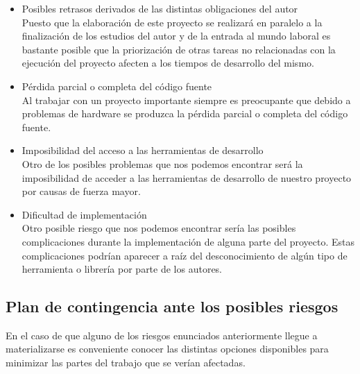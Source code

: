 \begin{itemize}
    \item Posibles retrasos derivados de las distintas obligaciones del autor\\
        Puesto que la elaboración de este proyecto se realizará en paralelo a la finalización de los estudios del autor y de la entrada al mundo laboral es bastante posible que la priorización de otras tareas no relacionadas con la ejecución del proyecto afecten a los tiempos de desarrollo del mismo.

    \item Pérdida parcial o completa del código fuente\\
        Al trabajar con un proyecto importante siempre es preocupante que debido a problemas de hardware se produzca la pérdida parcial o completa del código fuente.

    \item Imposibilidad del acceso a las herramientas de desarrollo\\
        Otro de los posibles problemas que nos podemos encontrar será la imposibilidad de acceder a las herramientas de desarrollo de nuestro proyecto por causas de fuerza mayor.

    \item Dificultad de implementación\\
        Otro posible riesgo que nos podemos encontrar sería las posibles complicaciones durante la implementación de alguna parte del proyecto. Estas complicaciones podrían aparecer a raíz del desconocimiento de algún tipo de herramienta o librería por parte de los autores.

\end{itemize}

\subsection{Plan de contingencia ante los posibles riesgos}
En el caso de que alguno de los riesgos enunciados anteriormente llegue a materializarse es conveniente conocer las distintas opciones disponibles para minimizar las partes del trabajo que se verían afectadas.


